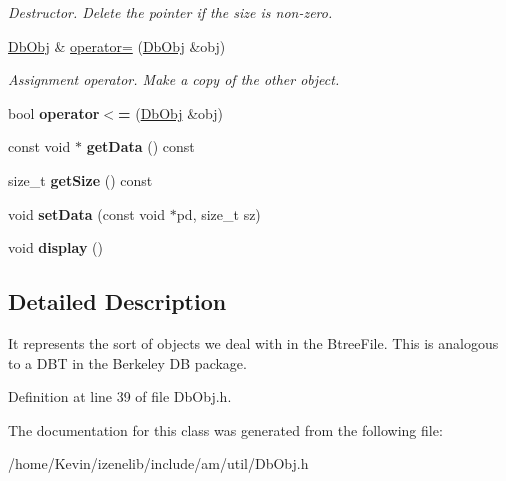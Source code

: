 \begin{CompactItemize}
\begin{CompactList}\small\item\em Destructor. Delete the pointer if the size is non-zero. \item\end{CompactList}\item 
\hypertarget{classutil_1_1DbObj_c31df94831fa0bd0fe3985dc7b75a537}{
\hyperlink{classutil_1_1DbObj}{DbObj} \& \hyperlink{classutil_1_1DbObj_c31df94831fa0bd0fe3985dc7b75a537}{operator=} (\hyperlink{classutil_1_1DbObj}{DbObj} \&obj)}
\label{classutil_1_1DbObj_c31df94831fa0bd0fe3985dc7b75a537}

\begin{CompactList}\small\item\em Assignment operator. Make a copy of the other object. \item\end{CompactList}\item 
\hypertarget{classutil_1_1DbObj_73bd7141e5cbb5dd8541a499d05b491f}{
bool \textbf{operator$<$=} (\hyperlink{classutil_1_1DbObj}{DbObj} \&obj)}
\label{classutil_1_1DbObj_73bd7141e5cbb5dd8541a499d05b491f}

\item 
\hypertarget{classutil_1_1DbObj_259462777be63c2c7f7aa17b57cd6294}{
const void $\ast$ \textbf{getData} () const }
\label{classutil_1_1DbObj_259462777be63c2c7f7aa17b57cd6294}

\item 
\hypertarget{classutil_1_1DbObj_46671534c7545b9a908838e82b7ec266}{
size\_\-t \textbf{getSize} () const }
\label{classutil_1_1DbObj_46671534c7545b9a908838e82b7ec266}

\item 
\hypertarget{classutil_1_1DbObj_1c4f5599227873c8116b4ceed4f17999}{
void \textbf{setData} (const void $\ast$pd, size\_\-t sz)}
\label{classutil_1_1DbObj_1c4f5599227873c8116b4ceed4f17999}

\item 
\hypertarget{classutil_1_1DbObj_b37c5a97bac8d4ba8a2ea3d8c3f02db9}{
void \textbf{display} ()}
\label{classutil_1_1DbObj_b37c5a97bac8d4ba8a2ea3d8c3f02db9}

\end{CompactItemize}


\subsection{Detailed Description}
It represents the sort of objects we deal with in the BtreeFile. This is analogous to a DBT in the Berkeley DB package. 

Definition at line 39 of file DbObj.h.

The documentation for this class was generated from the following file:\begin{CompactItemize}
\item 
/home/Kevin/izenelib/include/am/util/DbObj.h\end{CompactItemize}

